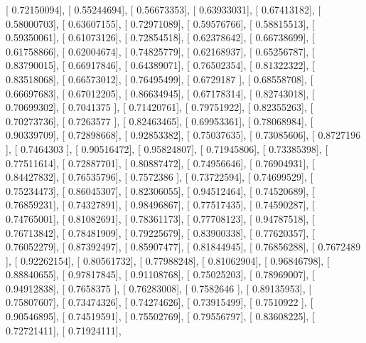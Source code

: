 \documentclass{article}
\begin{document}
       [ 0.72150094],
       [ 0.55244694],
       [ 0.56673353],
       [ 0.63933031],
       [ 0.67413182],
       [ 0.58000703],
       [ 0.63607155],
       [ 0.72971089],
       [ 0.59576766],
       [ 0.58815513],
       [ 0.59350061],
       [ 0.61073126],
       [ 0.72854518],
       [ 0.62378642],
       [ 0.66738699],
       [ 0.61758866],
       [ 0.62004674],
       [ 0.74825779],
       [ 0.62168937],
       [ 0.65256787],
       [ 0.83790015],
       [ 0.66917846],
       [ 0.64389071],
       [ 0.76502354],
       [ 0.81322322],
       [ 0.83518068],
       [ 0.66573012],
       [ 0.76495499],
       [ 0.6729187 ],
       [ 0.68558708],
       [ 0.66697683],
       [ 0.67012205],
       [ 0.86634945],
       [ 0.67178314],
       [ 0.82743018],
       [ 0.70699302],
       [ 0.7041375 ],
       [ 0.71420761],
       [ 0.79751922],
       [ 0.82355263],
       [ 0.70273736],
       [ 0.7263577 ],
       [ 0.82463465],
       [ 0.69953361],
       [ 0.78068984],
       [ 0.90339709],
       [ 0.72898668],
       [ 0.92853382],
       [ 0.75037635],
       [ 0.73085606],
       [ 0.8727196 ],
       [ 0.7464303 ],
       [ 0.90516472],
       [ 0.95824807],
       [ 0.71945806],
       [ 0.73385398],
       [ 0.77511614],
       [ 0.72887701],
       [ 0.80887472],
       [ 0.74956646],
       [ 0.76904931],
       [ 0.84427832],
       [ 0.76535796],
       [ 0.7572386 ],
       [ 0.73722594],
       [ 0.74699529],
       [ 0.75234473],
       [ 0.86045307],
       [ 0.82306055],
       [ 0.94512464],
       [ 0.74520689],
       [ 0.76859231],
       [ 0.74327891],
       [ 0.98496867],
       [ 0.77517435],
       [ 0.74590287],
       [ 0.74765001],
       [ 0.81082691],
       [ 0.78361173],
       [ 0.77708123],
       [ 0.94787518],
       [ 0.76713842],
       [ 0.78481909],
       [ 0.79225679],
       [ 0.83900338],
       [ 0.77620357],
       [ 0.76052279],
       [ 0.87392497],
       [ 0.85907477],
       [ 0.81844945],
       [ 0.76856288],
       [ 0.7672489 ],
       [ 0.92262154],
       [ 0.80561732],
       [ 0.77988248],
       [ 0.81062904],
       [ 0.96846798],
       [ 0.88840655],
       [ 0.97817845],
       [ 0.91108768],
       [ 0.75025203],
       [ 0.78969007],
       [ 0.94912838],
       [ 0.7658375 ],
       [ 0.76283008],
       [ 0.7582646 ],
       [ 0.89135953],
       [ 0.75807607],
       [ 0.73474326],
       [ 0.74274626],
       [ 0.73915499],
       [ 0.7510922 ],
       [ 0.90546895],
       [ 0.74519591],
       [ 0.75502769],
       [ 0.79556797],
       [ 0.83608225],
       [ 0.72721411],
       [ 0.71924111],
\end{document}
